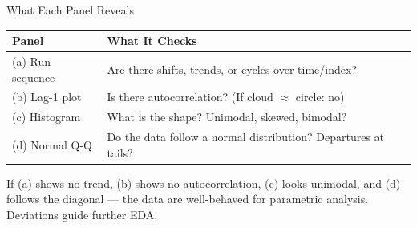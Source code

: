 \documentclass[10pt]{beamer}
\begin{document}
\begin{frame}{What Each Panel Reveals}
  \centering
  \begin{tabular}{lp{5.5cm}}
    \toprule
    \textbf{Panel} & \textbf{What It Checks} \\
    \midrule
    (a) Run sequence & Are there shifts, trends, or cycles over time/index? \\
    (b) Lag-1 plot & Is there autocorrelation? (If cloud $\approx$ circle: no) \\
    (c) Histogram & What is the shape? Unimodal, skewed, bimodal? \\
    (d) Normal Q-Q & Do the data follow a normal distribution? Departures at tails? \\
    \bottomrule
  \end{tabular}
  \vspace{6pt}

  {\small If (a) shows no trend, (b) shows no autocorrelation, (c) looks
  unimodal, and (d) follows the diagonal --- the data are well-behaved
  for parametric analysis. Deviations guide further EDA.}
\end{frame}
\end{document}
